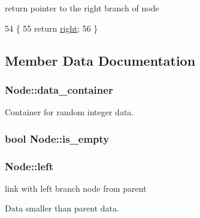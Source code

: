 return pointer to the right branch of node 


\begin{DoxyCode}
54                                    \{
55             \textcolor{keywordflow}{return} \hyperlink{class_node_a45c7b7ddeefcffe349a1f13ec586107c}{right};
56         \}
\end{DoxyCode}


\subsection{Member Data Documentation}
\hypertarget{class_node_ab10f24c6461961ed57ca11e942fc8c3e}{}
\subsubsection[{data\+\_\+container}]{\setlength{\rightskip}{0pt plus 5cm}Node\+::data\+\_\+container\hspace{0.3cm}{\ttfamily [private]}}\label{class_node_ab10f24c6461961ed57ca11e942fc8c3e}


Container for random integer data. 

\hypertarget{class_node_a03859657e8fb6e70be22fa53cb848241}{}
\subsubsection[{is\+\_\+empty}]{\setlength{\rightskip}{0pt plus 5cm}bool Node\+::is\+\_\+empty\hspace{0.3cm}{\ttfamily [private]}}\label{class_node_a03859657e8fb6e70be22fa53cb848241}
\hypertarget{class_node_a05ef70dd2b0b89db38cda977021ee696}{}
\subsubsection[{left}]{\setlength{\rightskip}{0pt plus 5cm}Node\+::left\hspace{0.3cm}{\ttfamily [private]}}\label{class_node_a05ef70dd2b0b89db38cda977021ee696}


link with left branch node from parent 

Data smaller than parent data. \hypertarget{class_node_a2149dcf83c930a3c0b388f51dbb42410}{}

